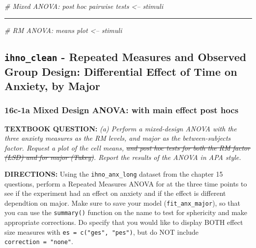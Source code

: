 \documentclass[]{article}
\newenvironment{Shaded}{\begin{snugshade}}{\end{snugshade}}
\newcommand{\CommentTok}[1]{\textcolor[rgb]{0.56,0.35,0.01}{\textit{#1}}}
\begin{document}
\begin{Shaded}
\begin{Highlighting}[]
\CommentTok{# Mixed ANOVA: post hoc pairwise tests <-- stimuli}
\end{Highlighting}
\end{Shaded}

\begin{center}\rule{0.5\linewidth}{\linethickness}\end{center}

\begin{Shaded}
\begin{Highlighting}[]
\CommentTok{# RM ANOVA: means plot <-- stimuli}
\end{Highlighting}
\end{Shaded}

\clearpage

\subsection{\texorpdfstring{\texttt{ihno\_clean} - Repeated Measures and
Observed Group Design: Differential Effect of Time on Anxiety, by
Major}{ihno\_clean - Repeated Measures and Observed Group Design: Differential Effect of Time on Anxiety, by Major}}\label{ihno_clean---repeated-measures-and-observed-group-design-differential-effect-of-time-on-anxiety-by-major}

\subsubsection{16c-1a Mixed Design ANOVA: with main effect post
hocs}\label{c-1a-mixed-design-anova-with-main-effect-post-hocs}

\textbf{TEXTBOOK QUESTION:} \emph{(a) Perform a mixed-design ANOVA with
the three anxiety measures as the RM levels, and major as the
between-subjects factor. Request a plot of the cell means, \sout{and
post hoc tests for both the RM factor (LSD) and for major (Tukey)}.
Report the results of the ANOVA in APA style.}

\textbf{DIRECTIONS:} Using the \texttt{ihno\_anx\_long} dataset from the
chapter 15 questions, perform a Repeated Measures ANOVA for at the three
time points to see if the experiment had an effect on anxiety and if the
effect is different dependtion on major. Make sure to save your model
(\texttt{fit\_anx\_major}), so that you can use the \texttt{summary()}
function on the name to test for sphericity and make appropriate
corrections. Do specify that you would like to display BOTH effect size
measures with \texttt{es\ =\ c("ges",\ "pes")}, but do NOT include
\texttt{correction\ =\ "none"}.
\end{document}
